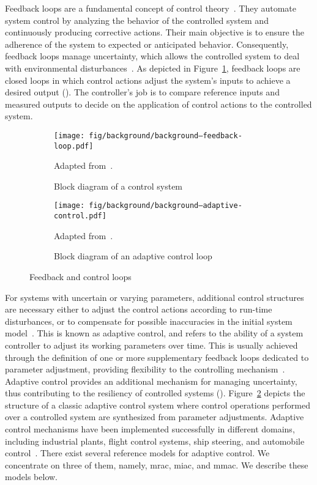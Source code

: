Feedback loops are a fundamental concept of control theory~\cite{doyle-2013-feedback}. They automate system control by analyzing the behavior of the controlled system and continuously producing corrective actions. Their main objective is to ensure the adherence of the system to expected or anticipated behavior. Consequently, feedback loops manage uncertainty, which allows the controlled system to deal with environmental disturbances~\cite{hellerstein-2004-feedback,astrom-2013-adaptive}. As depicted in Figure~\ref{fig:background--ct-feedback-loop}, feedback loops are closed loops in which control actions adjust the system's inputs to achieve a desired output (). The controller's job is to compare reference inputs and measured outputs to decide on the application of control actions to the controlled system.

\begin{figure}[h]
	\centering
	\begin{subfigure}[b]{0.6\linewidth}
		\centering
		\texttt{[image: fig/background/background--feedback-loop.pdf]}
		\caption{Block diagram of a control system}
		\label{fig:background--ct-feedback-loop}
		Adapted from~\cite{hellerstein-2004-feedback}.
		\vspace{3em}
	\end{subfigure}
	\begin{subfigure}[b]{0.6\linewidth}
		\centering
		\texttt{[image: fig/background/background--adaptive-control.pdf]}
		\caption{Block diagram of an adaptive control loop}
		\label{fig:background--ct-adaptive-control}
		Adapted from~\cite{astrom-2013-adaptive}.
	\end{subfigure}
	\caption{Feedback and control loops}
	\label{fig:background--ct-feedback-loops-all}
\end{figure}

For systems with uncertain or varying parameters, additional control structures are necessary either to adjust the control actions according to run-time disturbances, or to compensate for possible inaccuracies in the initial system model~\cite{weyns-2021-introduction}. This is known as adaptive control, and refers to the ability of a system controller to adjust its working parameters over time. This is usually achieved through the definition of one or more supplementary feedback loops dedicated to parameter adjustment, providing flexibility to the controlling mechanism~\cite{astrom-2013-adaptive}. Adaptive control provides an additional mechanism for managing uncertainty, thus contributing to the resiliency of controlled systems (). Figure~\ref{fig:background--ct-adaptive-control} depicts the structure of a classic adaptive control system where control operations performed over a controlled system are synthesized from parameter adjustments. Adaptive control mechanisms have been implemented successfully in different domains, including industrial plants, flight control systems, ship steering, and automobile control~\cite{astrom-2013-adaptive}. There exist several reference models for adaptive control. We concentrate on three of them, namely, \gls{mrac}, \gls{miac}, and \gls{mmac}. We describe these models below.


